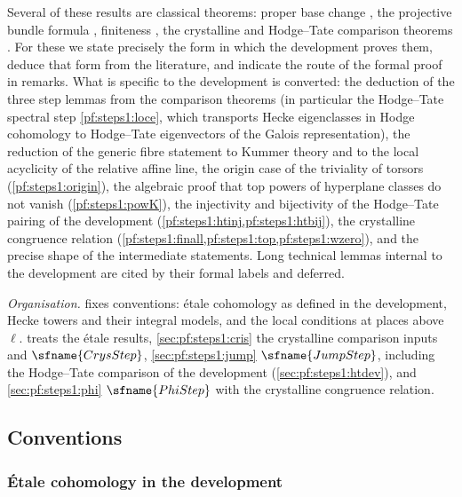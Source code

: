 Several of these results are classical theorems: proper base change \cite{ArtinGrothendieckVerdier1972},
the projective bundle formula \cite{Grothendieck1958,Grothendieck1977}, finiteness
\cite{ArtinGrothendieckVerdier1972,Deligne1977}, the crystalline and Hodge--Tate comparison theorems
\cite{Faltings1988,Faltings1989,FontaineMessing1987,Tsuji1999,BhattMorrowScholze2018}. For these we
state precisely the form in which the development proves them, deduce that form from the literature,
and indicate the route of the formal proof in remarks. What is specific to the development is
converted: the deduction of the three step lemmas from the comparison theorems (in particular the
Hodge--Tate spectral step \cref{pf:steps1:loce}, which transports Hecke eigenclasses in Hodge
cohomology to Hodge--Tate eigenvectors of the Galois representation), the reduction of the generic
fibre statement to Kummer theory and to the local acyclicity of the relative affine line, the origin
case of the triviality of torsors (\cref{pf:steps1:origin}), the algebraic proof that top powers of
hyperplane classes do not vanish (\cref{pf:steps1:powK}), the injectivity and bijectivity of the
Hodge--Tate pairing of the development (\cref{pf:steps1:htinj,pf:steps1:htbij}), the crystalline
congruence relation (\cref{pf:steps1:finall,pf:steps1:top,pf:steps1:wzero}), and the precise shape of
the intermediate statements. Long technical lemmas internal to the development are cited by their
formal labels and deferred.

\emph{Organisation.}  fixes conventions: \'etale cohomology as defined in
the development, Hecke towers and their integral models, and the local conditions at places above
$\ell$.  treats the \'etale results, \cref{sec:pf:steps1:cris} the
crystalline comparison inputs and $\sfname{CrysStep}$, \cref{sec:pf:steps1:jump} $\sfname{JumpStep}$, including
the Hodge--Tate comparison of the development (\cref{sec:pf:steps1:htdev}), and \cref{sec:pf:steps1:phi}
$\sfname{PhiStep}$ with the crystalline congruence relation.

\subsection{Conventions}\label{sec:pf:steps1:conv}

\subsubsection{\'Etale cohomology in the development}\label{sec:pf:steps1:conv:et}

